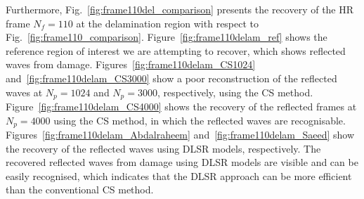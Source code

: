 Furthermore, Fig.~\ref{fig:frame110del_comparison} presents the recovery of the HR frame $N_f=110$ at the delamination region with respect to Fig.~\ref{fig:frame110_comparison}.
Figure~\ref{fig:frame110delam_ref} shows the reference region of interest we are attempting to recover, which shows reflected waves from damage.
Figures~\ref{fig:frame110delam_CS1024} and~\ref{fig:frame110delam_CS3000} show a poor reconstruction of the reflected waves at $N_p=1024$ and $N_p=3000$, respectively, using the CS method.
Figure~\ref{fig:frame110delam_CS4000} shows the recovery of the reflected frames at $N_p=4000$ using the CS method, in which the reflected waves are recognisable.
Figures~\ref{fig:frame110delam_Abdalraheem} and~\ref{fig:frame110delam_Saeed} show the recovery of the reflected waves using DLSR models, respectively.
The recovered reflected waves from damage using DLSR models are visible and can be easily recognised, which indicates that the DLSR approach can be more efficient than the conventional CS method. 


